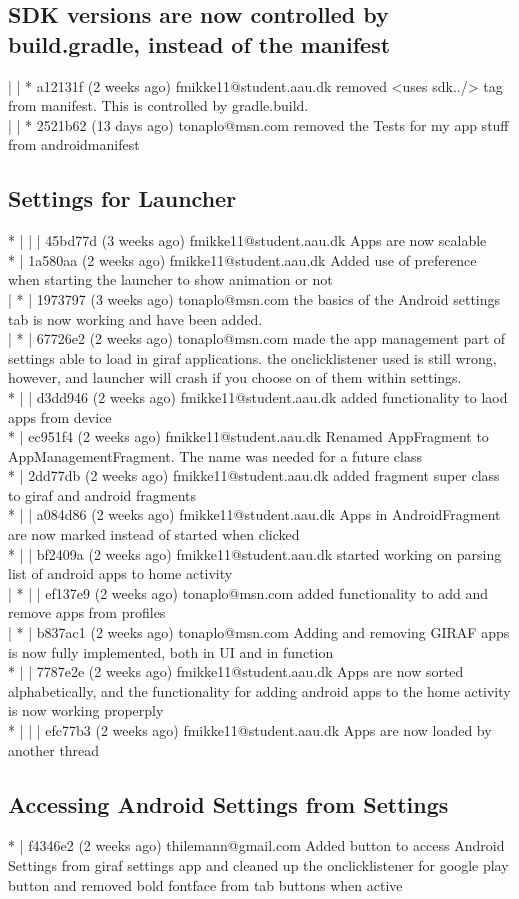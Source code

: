 \subsection{SDK versions are now controlled by build.gradle, instead of the manifest}
| | * a12131f (2 weeks ago) fmikke11@student.aau.dk removed <uses sdk../> tag from manifest. This is controlled by gradle.build.\\
| | * 2521b62 (13 days ago) tonaplo@msn.com removed the Tests for my app stuff from androidmanifest\\

\subsection{Settings for Launcher}
* | | | 45bd77d (3 weeks ago) fmikke11@student.aau.dk Apps are now scalable\\
* | 1a580aa (2 weeks ago) fmikke11@student.aau.dk Added use of preference when starting the launcher to show animation or not\\

| * | 1973797 (3 weeks ago) tonaplo@msn.com the basics of the Android settings tab is now working and have been added.\\
| * | 67726e2 (2 weeks ago) tonaplo@msn.com made the app management part of settings able to load in giraf applications. the onclicklistener used is still wrong, however, and launcher will crash if you choose on of them within settings.\\
* | | d3dd946 (2 weeks ago) fmikke11@student.aau.dk added functionality to laod apps from device\\
* | ec951f4 (2 weeks ago) fmikke11@student.aau.dk Renamed AppFragment to AppManagementFragment. The name was needed for a future class\\
* | 2dd77db (2 weeks ago) fmikke11@student.aau.dk added fragment super class to giraf and android fragments\\
* | | a084d86 (2 weeks ago) fmikke11@student.aau.dk Apps in AndroidFragment are now marked instead of started when clicked\\
* | | bf2409a (2 weeks ago) fmikke11@student.aau.dk started working on parsing list of android apps to home activity\\
| * | | ef137e9 (2 weeks ago) tonaplo@msn.com added functionality to add and remove apps from profiles\\
| * | b837ac1 (2 weeks ago) tonaplo@msn.com Adding and removing GIRAF apps is now fully implemented, both in UI and in function\\
* | | 7787e2e (2 weeks ago) fmikke11@student.aau.dk Apps are now sorted alphabetically, and the functionality for adding android apps to the home activity is now working properply\\
* | | | efc77b3 (2 weeks ago) fmikke11@student.aau.dk Apps are now loaded by another thread
 
 \subsection{Accessing Android Settings from Settings}
 * | f4346e2 (2 weeks ago) thilemann@gmail.com Added button to access Android Settings from giraf settings app and cleaned up the onclicklistener for google play button and removed bold fontface from tab buttons when active\\